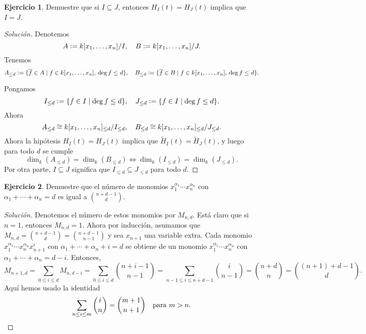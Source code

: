 \documentclass{article}
\theoremstyle{definition}
\newtheorem{ejerc}{Ejercicio}
\newenvironment{solucion}{\begin{proof}[Solución]}{\end{proof}}
\begin{document}
\begin{ejerc}
  Demuestre que si $I \subseteq J$, entonces $H_I (t) = H_J (t)$ implica que
  $I = J$.

  \ifdefined\solutions\begin{solucion}
    Denotemos
    $$A \mathrel{\mathop:}= k [x_1,\ldots,x_n]/I, \quad B \mathrel{\mathop:}= k [x_1,\ldots,x_n]/J.$$
    Tenemos
    \[ A_{\le d} \mathrel{\mathop:}= \{ \overline{f} \in A \mid
                         f \in k [x_1,\ldots,x_n], \, \deg f \le d \}, \quad
       B_{\le d} \mathrel{\mathop:}= \{ \overline{f} \in B \mid
                         f \in k [x_1,\ldots,x_n], \, \deg f \le d \}. \]

    Pongamos
    \[ I_{\le d} \mathrel{\mathop:}= \{ f \in I \mid \deg f \le d \}, \quad
       J_{\le d} \mathrel{\mathop:}= \{ f \in I \mid \deg f \le d \}. \]
    Ahora
    \[ A_{\le d} \cong k [x_1,\ldots,x_n]_{\le d}/I_{\le d}, \quad
      B_{\le d} \cong k [x_1,\ldots,x_n]_{\le d}/J_{\le d}. \]
    Ahora la hipótesis $H_I (t) = H_J (t)$ implica que
    $\widetilde{H}_I (t) = \widetilde{H}_J (t)$, y luego para todo $d$ se cumple
    \[ \dim_k (A_{\le d}) = \dim_k (B_{\le d}) \iff
       \dim_k (I_{\le d}) = \dim_k (J_{\le d}). \]
    Por otra parte, $I \subseteq J$ significa que
    $I_{\le d} \subseteq J_{\le d}$ para todo $d$.
  \end{solucion}\fi
\end{ejerc}

\begin{ejerc}
  Demuestre que el número de monomios $x_1^{\alpha_1}\cdots x_n^{\alpha_n}$ con
  $\alpha_1+\cdots+\alpha_n = d$ es igual a ${n+d-1 \choose d}$.

  \ifdefined\solutions\begin{solucion}
    Denotemos el número de estos monomios por $M_{n,d}$. Está claro que si
    $n = 1$, entonces $M_{n,d} = 1$. Ahora por inducción, asumamos que
    $M_{n,d} = {n+d-1 \choose d} = {n+d-1 \choose n-1}$ y sea $x_{n+1}$ una
    variable extra. Cada monomio $x_1^{\alpha_1}\cdots x_n^{\alpha_n} x_{n+1}^i$
    con $\alpha_1+\cdots+\alpha_n+i = d$ se obtiene de un monomio
    $x_1^{\alpha_1}\cdots x_n^{\alpha_n}$ con
    $\alpha_1+\cdots+\alpha_n = d-i$. Entonces,
    \[ M_{n+1,d} = \sum_{0 \le i \le d} M_{n,d-i} =
       \sum_{0 \le i \le d} {n+i-1 \choose n-1} =
       \sum_{n-1 \le i \le n+d-1} {i \choose n-1} =
       {n + d \choose n} = {(n+1) + d-1 \choose d}. \]
    Aquí hemos usado la identidad
    \[ \sum_{n \le i \le m} {i \choose n} =
       {m+1 \choose n+1} \quad\text{para }m > n. \qedhere \]
  \end{solucion}\fi
\end{ejerc}
\end{document}
